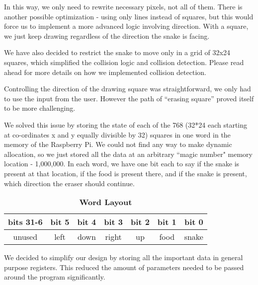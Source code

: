 \documentclass[9pt]{article}
\begin{document}
\begin{description}
        In this way, we only need to rewrite necessary pixels, not all of them. There is another possible optimization - using only lines instead of squares, but this would force us to implement a more advanced logic involving direction. With a square, we just keep drawing regardless of the direction the snake is facing.
     
        We have also decided to restrict the snake to move only in a grid of 32x24 squares, which simplified the collision logic and collision detection. Please read ahead for more details on how we implemented collision detection.
        
        Controlling the direction of the drawing square was straightforward, we only had to use the input from the user. However the path of “erasing square” proved itself to be more challenging.

We solved this issue by storing the state of each of the 768 (32*24 each starting at co-ordinates x and y equally divisible by 32) squares in one word in the memory of the Raspberry Pi. We could not find any way to make dynamic allocation, so we just stored all the data at an arbitrary ``magic number" memory location - 1,000,000. In each word, we have one bit each to say if the snake is present at that location, if the food is present there, and if the snake is present, which direction the eraser should continue.
        
    \begin{table}[h]
    \centering
    \caption*{\bf Word Layout}
    \begin{tabular}{ccccccc}
    bits 31-6 & bit 5 & bit 4 & bit 3 & bit 2 & bit 1 & bit 0 \\ \hline
    \multicolumn{1}{|c|}{unused} & \multicolumn{1}{c|}{left} & \multicolumn{1}{c|}{down} & \multicolumn{1}{c|}{right} & \multicolumn{1}{c|}{up} &      \multicolumn{1}{c|}{food} & \multicolumn{1}{c|}{snake} \\ \hline    

    \end{tabular}
    \end{table}
    
    We decided to simplify our design by storing all the important data in general purpose registers. This reduced the amount of parameters needed to be passed around the program significantly.
    

\end{description}
\end{document}
